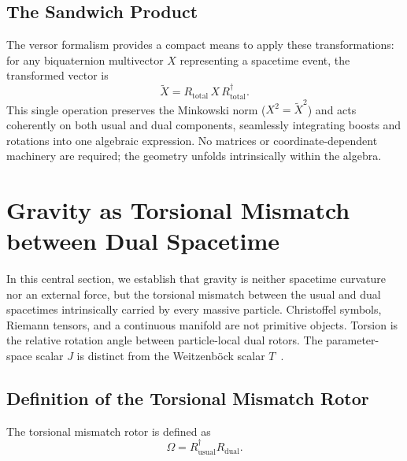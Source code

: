 \documentclass[a4paper]{article}
\begin{document}
\subsection{The Sandwich Product}

The versor formalism provides a compact means to apply these transformations: for any biquaternion multivector $X$ representing a spacetime event, the transformed vector is
\[
\tilde{X} = R_\text{total} \, X \, R_\text{total}^\dagger.
\]
This single operation preserves the Minkowski norm ($X^2 = \tilde{X}^2$) and acts coherently on both usual and dual components, seamlessly integrating boosts and rotations into one algebraic expression. No matrices or coordinate-dependent machinery are required; the geometry unfolds intrinsically within the algebra.

\section{Gravity as Torsional Mismatch between Dual Spacetime}
\label{sec:gravity}

In this central section, we establish that gravity is neither spacetime curvature nor an external force, but the torsional mismatch between the usual and dual spacetimes intrinsically carried by every massive particle. Christoffel symbols, Riemann tensors, and a continuous manifold are not primitive objects. Torsion is the relative rotation angle between particle-local dual rotors. The parameter-space scalar $J$ is distinct from the Weitzenb\"ock scalar $T$~\cite{weitzenboeck1923,maluf2013}.

\subsection{Definition of the Torsional Mismatch Rotor}

The torsional mismatch rotor is defined as
\[
\Omega = R_\text{usual}^\dagger R_\text{dual}.
\]
\end{document}
